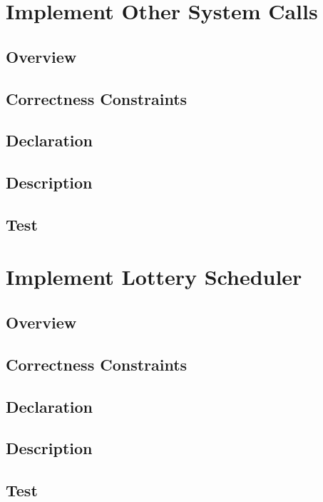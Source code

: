 \documentclass{article}
\begin{document}
\section{Implement Other System Calls}
\subsection{Overview}
\subsection{Correctness Constraints}
\subsection{Declaration}
\subsection{Description}
\subsection{Test}

\section{Implement Lottery Scheduler}
\subsection{Overview}
\subsection{Correctness Constraints}
\subsection{Declaration}
\subsection{Description}
\subsection{Test}
\end{document}
